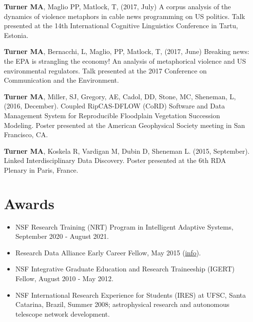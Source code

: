 \documentclass[letterpaper,11pt,oneside]{article}
\begin{document}
\begin{hangparas}{0.25in}{1}
\textbf{Turner MA}, Maglio PP, Matlock, T, (2017, July) A corpus analysis of the dynamics of violence metaphors in cable news programming on US politics. Talk presented at the 14th International Cognitive Linguistics Conference in Tartu, Estonia.

\textbf{Turner MA}, Bernacchi, L, Maglio, PP, Matlock, T, (2017, June) Breaking news: the EPA is strangling the economy! An analysis of metaphorical violence and US environmental regulators. Talk presented at the 2017 Conference on Communication and the Environment.

\textbf{Turner MA}, Miller, SJ, Gregory, AE, Cadol, DD, Stone, MC, Sheneman, L, (2016, December). Coupled RipCAS-DFLOW (CoRD) Software and Data Management System for Reproducible Floodplain Vegetation Succession Modeling. Poster presented at the American Geophysical Society meeting in San Francisco, CA.

\textbf{Turner MA}, Koskela R, Vardigan M, Dubin D, Sheneman L. (2015, September). Linked Interdisciplinary Data Discovery. Poster presented at the 6th RDA Plenary in Paris, France. 
  \end{hangparas}



\noindent
\section*{\textcolor{gunmetal}{Awards}}
\begin{itemize}
  \item NSF Research Training (NRT) Program in Intelligent Adaptive Systems, September 2020 - August 2021.
  \item Research Data Alliance Early Career Fellow, May 2015
    (\href{https://rd-alliance.org/rda_us data share program}{info}).
  \item NSF Integrative Graduate Education and Research Traineeship (IGERT) Fellow, August 2010 - May 2012.
  \item NSF International Research Experience for Students (IRES) at UFSC,
    Santa Catarina, Brazil, Summer 2008;
    astrophysical research and autonomous telescope network development.
\end{itemize}
\end{document}
